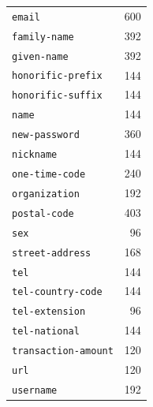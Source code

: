 \begin{longtable}{lr}
\texttt{email} & 600 \\  %
\texttt{family-name} & 392 \\  %
\texttt{given-name} & 392 \\  %
\texttt{honorific-prefix} & 144 \\  %
\texttt{honorific-suffix} & 144 \\  %
\texttt{name} & 144 \\  %
\texttt{new-password} & 360 \\  %
\texttt{nickname} & 144 \\  %
\texttt{one-time-code} & 240 \\  %
\texttt{organization} & 192 \\  %
\texttt{postal-code} & 403 \\  %
\texttt{sex} & 96 \\  %
\texttt{street-address} & 168 \\  %
\texttt{tel} & 144 \\  %
\texttt{tel-country-code} & 144 \\  %
\texttt{tel-extension} & 96 \\  %
\texttt{tel-national} & 144 \\  %
\texttt{transaction-amount} & 120 \\  %
\texttt{url} & 120 \\  %
\texttt{username} & 192 \\  %
\end{longtable}
\par\smallskip{}
